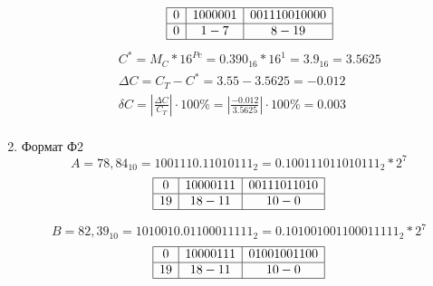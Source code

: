\documentclass{article}
\begin{document}
\begin{enumerate}
\begin{enumerate}
$$\begin{array}{|c|c|c|}
                                        \hline
                                        0 & 1000001 & 001110010000 \\\hline
                                        0 & 1 - 7   & 8 - 19 \\\hline
                                 \end{array}
                          $$
                          $$
                                 \begin{array}{c}
                                        C^*      = M_C * 16^{Pc} = 0.390_{16} * 16^1 = 3.9_{16}  = 3.5625                                                  \\
                                        \Delta C = C_T - C^* = 3.55 - 3.5625 = -0.012                                                                      \\
                                        \delta C = \left|\frac{\Delta C}{C_T}\right| \cdot 100\% = \left|\frac{-0.012}{3.5625 }\right| \cdot 100\% = 0.003 \\
                                 \end{array}
                          $$
             \end{enumerate}
       \item Формат Ф2
             $$ A = 78,84_{10} = 1001110.11010111_{2} = 0.100111011010111_{2} * 2^{7} $$
             $$
                    \begin{array}{|c|c|c|}
                           \hline
                           0  & 10000111 & 00111011010 \\\hline
                           19 & 18-11    & 10-0 \\\hline
                    \end{array}
             $$
             
             $$ B = 82,39_{10} = 1010010.01100011111_{2} = 0.101001001100011111_{2} * 2^{7} $$
             $$
                    \begin{array}{|c|c|c|}
                           \hline
                           0  & 10000111 & 01001001100 \\\hline
                           19 & 18-11    & 10-0 \\\hline
                    \end{array}
             $$
             

\end{enumerate}
\end{document}
